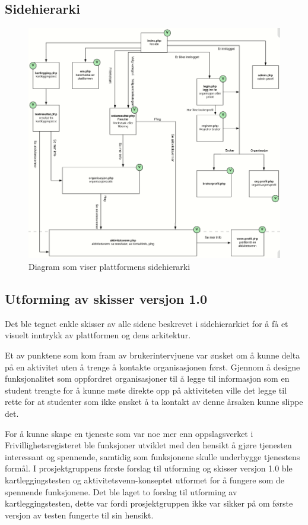 \subsection{Sidehierarki}
\begin{figure}[H]
\includegraphics[width=\textwidth]{Illustrasjoner/trehierarki.png}
\caption{Diagram som viser plattformens sidehierarki}
\label{fig:trehierarki}
\end{figure}


\subsection{Utforming av skisser versjon 1.0}

Det ble tegnet enkle skisser av alle sidene beskrevet i sidehierarkiet for å få et visuelt inntrykk av plattformen og dens arkitektur.

Et av punktene som kom fram av brukerintervjuene var ønsket om å kunne delta på en aktivitet uten å trenge å kontakte organisasjonen først. Gjennom å designe funksjonalitet som oppfordret organisasjoner til å legge til informasjon som en student trengte for å kunne møte direkte opp på aktiviteten ville det legge til rette for at studenter som ikke ønsket å ta kontakt av denne årsaken kunne slippe det.

For å kunne skape en tjeneste som var noe mer enn oppslagsverket i Frivillighetsregisteret ble funksjoner utviklet med den hensikt å gjøre tjenesten interessant og spennende, samtidig som funksjonene skulle underbygge tjenestens formål. I prosjektgruppens første forslag til utforming og skisser versjon 1.0 ble kartleggingstesten og aktivitetsvenn-konseptet utformet for å fungere som de spennende funksjonene. Det ble laget to forslag til utforming av kartleggingstesten, dette var fordi prosjektgruppen ikke var sikker på om første versjon av testen fungerte til sin hensikt.

